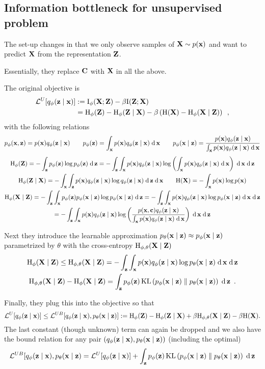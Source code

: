 \subsection{Information bottleneck for unsupervised problem}
The set-up changes in that we only observe samples of $\bX \sim p(\bx)$ and want to predict $\bX$ from the representation $\bZ$.

Essentially, they replace $\bC$ with $\bX$ in all the above.

The original objective is 
\begin{align}\label{ibvar:optimunsuper}
\mL^{U}[\qfz] 
& := \rI_{\phi}(\bX; \bZ) - \beta \rI(\bZ; \bX) \nn
& = \rH_\phi(\bZ) - \rH_\phi(\bZ \mid \bX) - \beta \left( \rH(\bX) - \rH_\phi(\bX \mid \bZ) \right) 
 \enspace ,
\end{align}
with the following relations
\begin{gather}
p_\phi(\bx , \bz) = p(\bx) \qfz \qquad p_\phi(\bz) = \int_\bx p(\bx) \qfz \dif \bx \qquad 
p_\phi(\bx \mid \bz) = \frac{p(\bx) \qfz}{\int_\bx p(\bx) \qfz \dif \bx} \nonumber
\end{gather}
\begin{gather}
\rH_\phi(\bZ)  = - \int_\bz p_\phi(\bz) \log p_\phi(\bz) \dif \bz
= - \int_\bz \int_\bx p(\bx) \qfz \log \left( \int_\bx p(\bx) \qfz \dif \bx \right) \dif \bx \dif \bz
\nn
\rH_\phi(\bZ \mid \bX) = - \int_\bx \int_\bz  p(\bx) \qfz \log \qfz \dif \bz \dif \bx 
\qquad 
\rH(\bX) = - \int_\bx p(\bx) \log p(\bx)
\nn 
\rH_\phi(\bX \mid \bZ)
 = - \int_\bz \int_\bx p_\phi(\bz) p_\phi(\bx \mid \bz) \log p_\phi(\bx \mid \bz) \dif \bz 
 = - \int_\bz \int_\bx p(\bx) \qfz \log p_\phi(\bx \mid \bz) \dif \bx \dif \bz \nn
 = - \int_\bz \int_\bx p(\bx) \qfz \log \left( \frac{p(\bx, \bc) \qfz}{\int_\bx p(\bx) \qfz \dif \bx} \right) \dif \bx \dif \bz \nonumber
\end{gather}

Next they introduce the learnable approximation $\ptx \approx p_\phi(\bx \mid \bz)$ parametrized by $\theta$ with the cross-entropy $\rH_{\phi, \theta}(\bX \mid \bZ)$
\begin{gather}
\rH_\phi(\bX \mid \bZ) \leq \rH_{\phi, \theta}(\bX \mid \bZ)
= - \int_\bz \int_\bx p(\bx) \qfz \log \ptx \dif \bx \dif \bz 
\nn
\rH_{\phi, \theta}(\bX \mid \bZ) - \rH_\phi(\bX \mid \bZ) =
\int_\bz p_\phi(\bz) \KL{p_\phi(\bx \mid \bz)}{\ptx} \dif \bz
\enspace .
\end{gather}

Finally, they plug this into the objective so that
\begin{equation}\label{ibvar:otimunsuperb}
\mL^U[\qfz] \leq \mL^{UB}[\qfz, \ptx] := \rH_\phi(\bZ) - \rH_\phi(\bZ \mid \bX) + \beta \rH_{\phi, \theta}(\bX \mid \bZ) - \beta \rH(\bX).
\end{equation}
The last constant (though unknown) term can again be dropped and we also have the bound relation for any pair $(\qfz, \ptx)$ (including the optimal)
\begin{equation}
\mL^{UB}[\qfz, \ptx = \mL^U[\qfz] + \int_\bz p_\phi(\bz) \KL{p_\phi(\bx \mid \bz)}{\ptx} \dif \bz
\end{equation}


